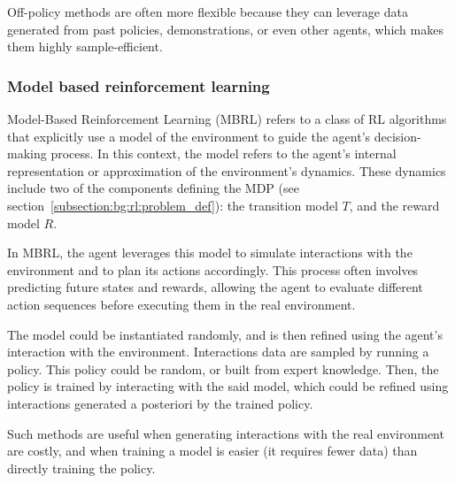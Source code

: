 Off-policy methods are often more flexible because they can leverage data generated from past policies, demonstrations,
or even other agents, which makes them highly sample-efficient.

\subsubsection{Model based reinforcement learning}

Model-Based Reinforcement Learning (MBRL) refers to a class of RL algorithms that explicitly
use a model of the environment to guide the agent's decision-making process.
In this context, the model refers to the agent's internal representation or approximation of the environment's dynamics.
These dynamics include two of the components defining the MDP (see section~\ref{subsection:bg:rl:problem_def}): the transition model $T$,
and the reward model $R$.

In MBRL, the agent leverages this model to simulate interactions with the environment and to plan its actions accordingly.
This process often involves predicting future states and rewards, allowing the agent to evaluate different action
sequences before executing them in the real environment.

The model could be instantiated randomly, and is then refined using the agent's interaction with the environment.
Interactions data are sampled by running a policy.
This policy could be random, or built from expert knowledge.
Then, the policy is trained by interacting with the said model, which could be refined using interactions generated a
posteriori by the trained policy.

Such methods are useful when generating interactions with the real environment are costly, and when training a model
is easier (it requires fewer data) than directly training the policy.


 


